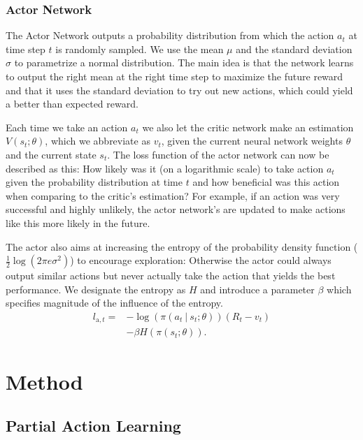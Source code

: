 \documentclass[sigconf]{acmart}
\newcommand\givenbase[1][]{\:#1\lvert\:}
\let\given\givenbase
\begin{document}
\subsubsection{Actor Network}
\label{subsubsec:genericactor}

The Actor Network outputs a probability distribution from which the action $a_t$ at time step $t$ is randomly sampled. We use the mean $\mu$ and the standard deviation $\sigma$ to parametrize a normal distribution. The main idea is that the network learns to output the right mean at the right time step to maximize the future reward and that it uses the standard deviation to try out new actions, which could yield a better than expected reward. 

Each time we take an action $a_t$ we also let the critic network make an estimation $V(s_t; \theta)$, which we abbreviate as $v_t$, given the current neural network weights $\theta$ and the current state $s_t$. The loss function of the actor network can now be described as this: How likely was it (on a logarithmic scale) to take action $a_t$ given the probability distribution at time $t$ and how beneficial was this action when comparing to the critic's estimation? For example, if an action was very successful and highly unlikely, the actor network's are updated to make actions like this more likely in the future. 

The actor also aims at increasing the entropy of the probability density function ($\frac{1}{2} \log \left( 2 \pi e \sigma^2 \right)$) to encourage exploration: Otherwise the actor could always output similar actions but never actually take the action that yields the best performance. We designate the entropy as $H$ and introduce a parameter $\beta$ which specifies magnitude of the influence of the entropy. 
\begin{align*}
l_{\text{a},t} =& -\log \left( \pi\left( a_t \given s_t; \theta \right)\right)\left( R_t - v_t \right)\\ 
&- \beta H\left( \pi\left( s_t; \theta \right)\right).
\end{align*}

\section{Method}
\subsection{Partial Action Learning}
\label{subsec:pal}
\end{document}
